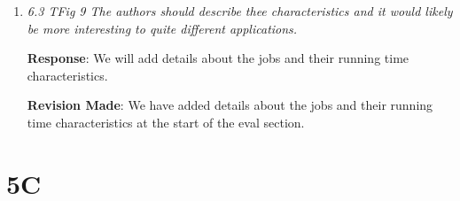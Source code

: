 \documentclass{article}
\newcommand{\resp}[1]{\textbf{Response}: #1}
\newcommand{\revmade}[1]{\textbf{Revision Made}: #1}
\begin{document}
\begin{enumerate}
\revmade{We will clarify that Fig 8 evaluates a wide range of job lengths [0--9 hours], in Section 6.2.2.}


\item \emph{6.3 TFig 9 The authors should describe thee characteristics and it would likely be more interesting to quite different applications.}

\resp{We will add details about the jobs and their running time characteristics.}

\revmade{We have added details about the jobs and their running time characteristics at the start of the eval section.}

\end{enumerate}

\section{5C}
\end{document}
